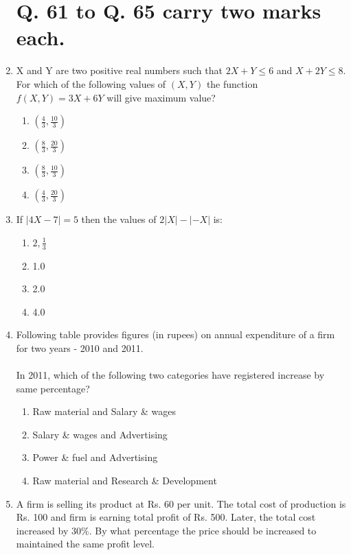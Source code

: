 \documentclass[journal]{IEEEtran}
\begin{document}
\begin{enumerate}
  \section*{Q. 61 to Q. 65 carry two marks each.}
\item   X and Y are two positive real numbers such that $2 X+Y \leq 6$ and $X+2 Y \leq 8$. For which of the following values of $(X, Y)$ the function $f(X, Y)=3 X+6 Y$ will give maximum value?
\begin{multicols}{4}
			\begin{enumerate}

\item  $(\frac{4}  {3},\frac{10} { 3})$
\item $(\frac{8} {3},\frac{20} {3})$
\item $(\frac{8} {3},\frac{10}{ 3})$
\item $(\frac{4} { 3},\frac{20} { 3})$
   \end{enumerate}
		\end{multicols}
  \item  If $|4 X-7|=5$ then the values of $2|X|-|-X|$ is:
  \begin{multicols}{4}
			\begin{enumerate}
   \item $2,\frac{1} {3}$
\item 1.0
\item  2.0
\item 4.0
 \end{enumerate}
		\end{multicols}
  \item Following table provides figures (in rupees) on annual expenditure of a firm for two years - 2010 and 2011.\\
\\In 2011, which of the following two categories have registered increase by same percentage?
\begin{table}[h!]
	\centering
	
\end{table}
 
			\begin{enumerate}
   \item Raw material and Salary \& wages
\item Salary \& wages and Advertising
\item  Power \& fuel and Advertising
\item Raw material and Research \& Development
 \end{enumerate}
	
  \item   A firm is selling its product at Rs. 60 per unit. The total cost of production is Rs. 100 and firm is earning total profit of Rs. 500. Later, the total cost increased by $30 \%$. By what percentage the price should be increased to maintained the same profit level.
  


\end{enumerate}
\end{document}
